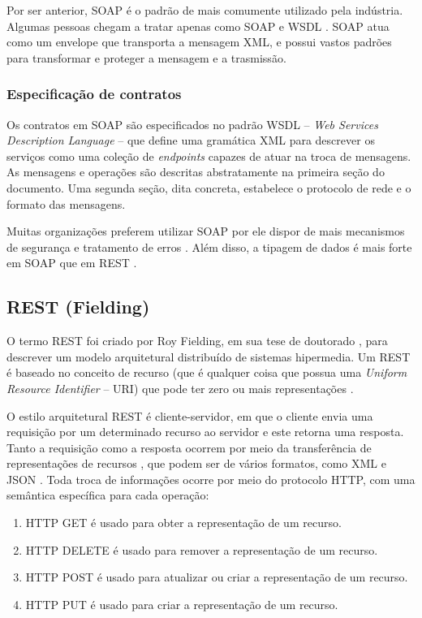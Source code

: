 Por ser anterior, SOAP é o padrão de \ws{} mais comumente utilizado pela
indústria.
Algumas pessoas chegam a tratar \ws{} apenas como SOAP e WSDL
\cite{serrano2014service}. SOAP atua como um envelope que transporta a mensagem
XML, e possui vastos padrões para transformar e proteger a mensagem e a
trasmissão. 


\subsubsection{Especificação de contratos}
\vspace{-6mm}

Os contratos em SOAP são especificados no padrão WSDL -- \textit{Web Services
Description Language} -- que define uma gramática XML para descrever os serviços
como uma coleção de \textit{endpoints} capazes de atuar na troca de mensagens.
As mensagens e operações são descritas abstratamente na primeira seção do
documento. Uma segunda seção, dita concreta, estabelece o protocolo de rede e o
formato das mensagens.

Muitas organizações preferem utilizar SOAP por ele dispor de mais mecanismos de
segurança e tratamento de erros \cite{serrano2014service}. Além disso, a tipagem
de dados é mais forte em SOAP que em REST \cite{mumbaikar2013web}.


\subsection{REST (Fielding)}
\label{secaoREST}
\vspace{-6mm}

O termo REST foi criado por Roy Fielding, em sua tese de doutorado
\cite{fielding2000architectural}, para descrever um modelo arquitetural
distribuído de sistemas hipermedia. Um \ws{} REST é baseado no conceito de
recurso (que é qualquer coisa que possua uma \textit{Uniform Resource
Identifier} -- URI) que pode ter zero ou mais representações
\cite{he2003service}.

O estilo arquitetural REST é cliente-servidor, em que o cliente envia uma
requisição por um determinado recurso ao servidor e este retorna uma resposta.
Tanto a requisição como a resposta ocorrem por meio da transferência de
representações de recursos \cite{mumbaikar2013web}, que podem ser de vários
formatos, como XML e JSON \cite{serrano2014service}. Toda troca de informações
ocorre por meio do protocolo HTTP, com uma semântica específica para cada
operação:

\begin{enumerate}
\item HTTP GET é usado para obter a representação de um recurso.
\item HTTP DELETE é usado para remover a representação de um recurso.
\item HTTP POST é usado para atualizar ou criar a representação de um recurso.
\item HTTP PUT é usado para criar a representação de um recurso.
\end{enumerate}

